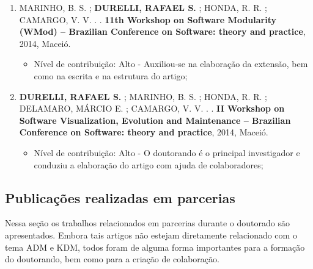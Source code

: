 \begin{itemize}
\begin{enumerate}
		\item MARINHO, B. S. ; \textbf{DURELLI, RAFAEL S.} ; HONDA, R. R. ; CAMARGO, V. V. . . \textbf{11th Workshop on Software Modularity (WMod) -- Brazilian Conference on Software: theory and practice}, 2014, Maceió.
		
		\begin{itemize}
			        \item Nível de contribuição: Alto - Auxiliou-se na elaboração da extensão, bem como na escrita e na estrutura do artigo;
			    \end{itemize}
		
		\item \textbf{DURELLI, RAFAEL S.} ; MARINHO, B. S. ; HONDA, R. R. ; DELAMARO, MÁRCIO E. ; CAMARGO, V. V. . . \textbf{II Workshop on Software Visualization, Evolution and Maintenance -- Brazilian Conference on Software: theory and practice}, 2014, Maceió.
		
		    \begin{itemize}
			        \item Nível de contribuição: Alto - O doutorando é o principal investigador e conduziu a elaboração do artigo com ajuda de colaboradores;
			    \end{itemize}
\end{enumerate}
\end{itemize}

\subsection{Publicações realizadas em parcerias}

Nessa seção os trabalhos relacionados em parcerias durante o doutorado são apresentados. Embora tais artigos não estejam diretamente relacionado com o tema ADM e KDM, todos foram de alguma forma importantes para a formação do doutorando, bem como para a criação de colaboração.

